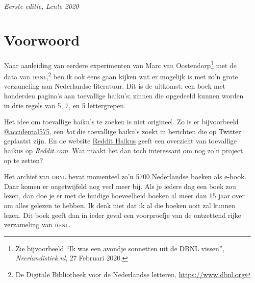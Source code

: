 \documentclass[11pt,paper=a4,footinclude,headinclude]{scrbook} %
\begin{document}
\begin{titlepage}
    \begin{addmargin}[-1cm]{-3cm}
    \begin{center}
        \large

        \hfill

        \vfill

        \begingroup
            \color{CTtitle} \\ \bigskip
        \endgroup
	
        \\ \bigskip
        \small{\textit{Eerste editie, Lente 2020}}
        \vfill
        \null
    \end{center}
  \end{addmargin}
\end{titlepage}

\frontmatter
\chapter*{Voorwoord}
Naar aanleiding van eerdere experimenten van Marc van Oostendorp\footnote{Zie bijvoorbeeld ``Ik was een avondje sonnetten uit de DBNL vissen'', \textit{Neerlandistiek.nl}, 27 Februari 2020.} met de data van \textsc{dbnl},\footnote{De Digitale Bibliotheek voor de Nederlandse letteren, \url{https://www.dbnl.org}} ben ik ook eens gaan kijken wat er mogelijk is met zo'n grote verzameling aan Nederlandse literatuur. Dit is de uitkomst: een boek met honderden pagina's aan toevallige haiku's; zinnen die opgedeeld kunnen worden in drie regels van 5, 7, en 5 lettergrepen.

Het idee om toevallige haiku's te zoeken is niet origineel. Zo is er bijvoorbeeld \href{https://twitter.com/accidental575}{@accidental575}, een \textit{bot} die toevallige haiku's zoekt in berichten die op Twitter geplaatst zijn. En de website \href{https://haiku.somebullshit.net}{Reddit Haikus} geeft een overzicht van toevallige haikus op \textit{Reddit.com}. Wat maakt het dan toch interessant om nog zo'n project op te zetten?

Het archief van \textsc{dbnl} bevat momenteel zo'n 5700 Nederlandse boeken als e-book. Daar komen er ongetwijfeld nog veel meer bij. Als je iedere dag een boek zou lezen, dan doe je er met de huidige hoeveelheid boeken al meer dan 15 jaar over om alles gelezen te hebben. Ik denk niet dat ik al die boeken ooit zal kunnen lezen. Dit boek geeft dan in ieder geval een voorproefje van de ontzettend rijke verzameling van \textsc{dbnl}.
\end{document}
